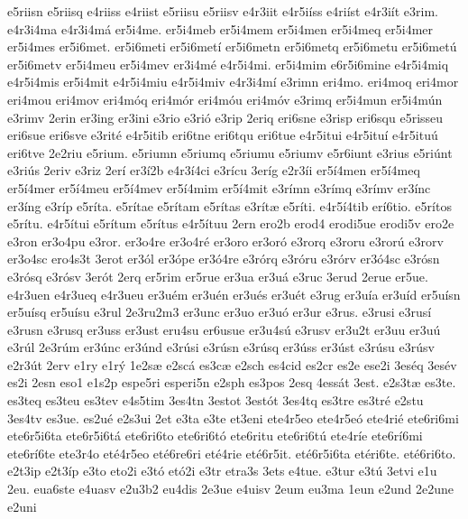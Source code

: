 {e5riisn
e5riisq
e4riiss
e4riist
e5riisu
e5riisv
e4r3iit
e4r5i^^edss
e4ri^^edst
e4r3i^^edt
e3rim.
e4r3i4ma
e4r3i4m^^e1
er5i4me.
er5i4meb
er5i4mem
er5i4men
er5i4meq
er5i4mer
er5i4mes
er5i6met.
er5i6meti
er5i6met^^ed
er5i6metn
er5i6metq
er5i6metu
er5i6met^^fa
er5i6metv
er5i4meu
er5i4mev
er3i4m^^e9
e4r5i4mi.
er5i4mim
e6r5i6mine
e4r5i4miq
e4r5i4mis
er5i4mit
e4r5i4miu
e4r5i4miv
e4r3i4m^^ed
e3rimn
eri4mo.
eri4moq
eri4mor
eri4mou
eri4mov
eri4m^^f3q
eri4m^^f3r
eri4m^^f3u
eri4m^^f3v
e3rimq
er5i4mun
er5i4m^^fan
e3rimv
2erin
er3ing
er3ini
e3rio
e3ri^^f3
e3rip
2eriq
eri6sne
e3risp
eri6squ
e5risseu
eri6sue
eri6sve
e3rit^^e9
e4r5itib
eri6tne
eri6tqu
eri6tue
e4r5itui
e4r5itu^^ed
e4r5itu^^fa
eri6tve
2e2riu
e5rium.
e5riumn
e5riumq
e5riumu
e5riumv
e5r6iunt
e3rius
e5ri^^fant
e3ri^^fas
2eriv
e3riz
2er^^ed
er3^^ed2b
e4r3^^ed4ci
e3r^^edcu
3er^^edg
e2r3^^edi
er5^^ed4men
er5^^ed4meq
er5^^ed4mer
er5^^ed4meu
er5^^ed4mev
er5^^ed4mim
er5^^ed4mit
e3r^^edmn
e3r^^edmq
e3r^^edmv
er3^^ednc
er3^^edng
e3r^^edp
e5r^^edta.
e5r^^edtae
e5r^^edtam
e5r^^edtas
e3r^^edt^^e6
e5r^^edti.
e4r5^^ed4tib
er^^ed6tio.
e5r^^edtos
e5r^^edtu.
e4r5^^edtui
e5r^^edtum
e5r^^edtus
e4r5^^edtuu
2ern
ero2b
erod4
erodi5ue
erodi5v
ero2e
e3ron
er3o4pu
e3ror.
er3o4re
er3o4r^^e9
er3oro
er3or^^f3
e3rorq
e3roru
e3ror^^fa
e3rorv
er3o4sc
ero4s3t
3erot
er3^^f3l
er3^^f3pe
er3^^f34re
e3r^^f3rq
e3r^^f3ru
e3r^^f3rv
er3^^f34sc
e3r^^f3sn
e3r^^f3sq
e3r^^f3sv
3er^^f3t
2erq
er5rim
er5rue
er3ua
er3u^^e1
e3ruc
3erud
2erue
er5ue.
e4r3uen
e4r3ueq
e4r3ueu
er3u^^e9m
er3u^^e9n
er3u^^e9s
er3u^^e9t
e3rug
er3u^^eda
er3u^^edd
er5u^^edsn
er5u^^edsq
er5u^^edsu
e3rul
2e3ru2m3
er3unc
er3uo
er3u^^f3
er3ur
e3rus.
e3rusi
e3rus^^ed
e3rusn
e3rusq
er3uss
er3ust
eru4su
er6usue
er3u4s^^fa
e3rusv
er3u2t
er3uu
er3u^^fa
e3r^^fal
2e3r^^fam
er3^^fanc
er3^^fand
e3r^^fasi
e3r^^fasn
e3r^^fasq
er3^^fass
er3^^fast
e3r^^fasu
e3r^^fasv
e2r3^^fat
2erv
e1ry
e1r^^fd
1e2s^^e6
e2sc^^e1
es3c^^e6
e2sch
es4cid
es2cr
es2e
ese2i
3es^^e9q
3es^^e9v
es2i
2esn
eso1
e1s2p
espe5ri
esperi5n
e2sph
es3pos
2esq
4ess^^e1t
3est.
e2s3t^^e6
es3te.
es3teq
es3teu
es3tev
e4s5tim
3es4tn
3estot
3est^^f3t
3es4tq
es3tre
es3tr^^e9
e2stu
3es4tv
es3ue.
es2u^^e9
e2s3ui
2et
e3ta
e3te
et3eni
ete4r5eo
ete4r5e^^f3
ete4ri^^e9
ete6ri6mi
ete6r5i6ta
ete6r5i6t^^e1
ete6ri6to
ete6ri6t^^f3
ete6ritu
ete6ri6t^^fa
ete4r^^ede
ete6r^^ed6mi
ete6r^^ed6te
ete3r4o
et^^e94r5eo
et^^e96re6ri
et^^e94rie
et^^e96r5it.
et^^e96r5i6ta
et^^e9ri6te.
et^^e96ri6to.
e2t3ip
e2t3^^edp
e3to
eto2i
e3t^^f3
et^^f32i
e3tr
etra3s
3ets
e4tue.
e3tur
e3t^^fa
3etvi
e1u
2eu.
eua6ste
e4uasv
e2u3b2
eu4dis
2e3ue
e4uisv
2eum
eu3ma
1eun
e2und
2e2une
e2uni
}

